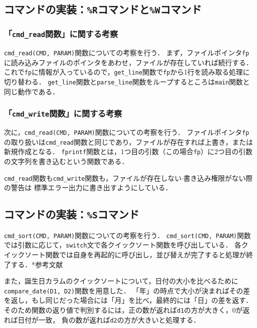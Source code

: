 \documentclass[autodetect-engine,dvi=dvipdfmx,ja=standard,
               a4j,11pt]{bxjsarticle}
\begin{document}
\subsection{コマンドの実装：\texttt{\%R}コマンドと\texttt{\%W}コマンド}

\subsubsection{「\texttt{cmd\_read}関数」に関する考察}

\verb|cmd_read(CMD, PARAM)|関数についての考察を行う．
まず，ファイルポインタ\verb|fp|に読み込みファイルのポインタをあわせ，ファイルが存在していれば続行する．
これで\verb|fp|に情報が入っているので，\verb|get_line|関数で\verb|fp|から1行を読み取る処理に切り替わる．
\verb|get_line|関数と\verb|parse_line|関数をループするところは\verb|main|関数と同じ動作である．

\subsubsection{「\texttt{cmd\_write}関数」に関する考察}

次に，\verb|cmd_read(CMD, PARAM)|関数についての考察を行う．
ファイルポインタ\verb|fp|の取り扱いは\verb|cmd_read|関数と同じであり，ファイルが存在すれば上書き，または新規作成となる．
\verb|fprintf|関数とは，1つ目の引数（この場合\verb|fp|）に2つ目の引数の文字列を書き込むという関数である．

\verb|cmd_read|関数も\verb|cmd_write|関数も，ファイルが存在しない$\cdot$書き込み権限がない際の警告は
標準エラー出力に書き出すようにしている．

\subsection{コマンドの実装：\texttt{\%S}コマンド}

\verb|cmd_sort(CMD, PARAM)|関数についての考察を行う．
\verb|cmd_sort(CMD, PARAM)|関数では引数に応じて，\verb|switch|文で各クイックソート関数を呼び出している．
各クイックソート関数では自身を再起的に呼び出し，並び替えが完了すると処理が終了する．*参考文献\cite{book:algodata}

また，誕生日カラムのクイックソートについて，日付の大小を比べるために\verb|compare_date(D1, D2)|関数を用意した．
「年」の時点で大小が決まればその差を返し，もし同じだった場合には「月」を比べ，最終的には「日」の差を返す．
そのため関数の返り値で判別するには，正の数が返れば\verb|d1|の方が大きく，$0$が返れば日付が一致，
負の数が返れば\verb|d2|の方が大きいと処理する．
\end{document}

